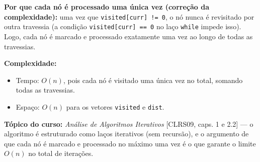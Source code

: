 \textbf{Por que cada nó é processado uma única vez (correção da
complexidade):} uma vez que \texttt{visited[curr] != 0}, o nó nunca é
revisitado por outra travessia (a condição \texttt{visited[curr] == 0} no
laço \texttt{while} impede isso). Logo, cada nó é marcado e processado
exatamente uma vez ao longo de todas as travessias.

\textbf{Complexidade:}
\begin{itemize}
    \item Tempo: $O(n)$, pois cada nó é visitado uma única vez no total,
    somando todas as travessias.
    \item Espaço: $O(n)$ para os vetores \texttt{visited} e \texttt{dist}.
\end{itemize}

\textbf{Tópico do curso:} \emph{Análise de Algoritmos Iterativos} [CLRS09,
caps. 1 e 2.2] --- o algoritmo é estruturado como laços iterativos (sem
recursão), e o argumento de que cada nó é marcado e processado no máximo uma
vez é o que garante o limite $O(n)$ no total de iterações.
